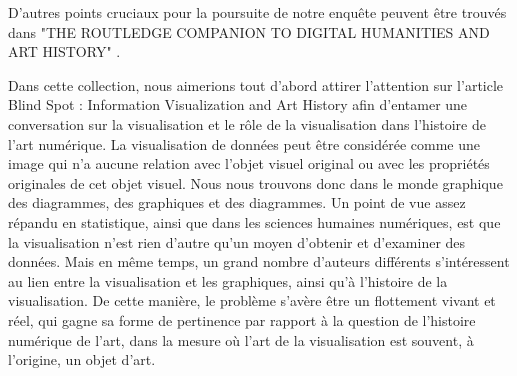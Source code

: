 \documentclass[a4paper, twoside, 12pt]{book}
\begin{document}
D'autres points cruciaux pour la poursuite de notre enquête peuvent être trouvés dans "THE ROUTLEDGE COMPANION TO DIGITAL HUMANITIES AND ART HISTORY" .

Dans cette collection, nous aimerions tout d'abord attirer l'attention sur l'article Blind Spot : Information Visualization and Art History afin d'entamer une conversation sur la visualisation et le rôle de la visualisation dans l'histoire de l'art numérique. La visualisation de données peut être considérée comme une image qui n'a aucune relation avec l'objet visuel original ou avec les propriétés originales de cet objet visuel. Nous nous trouvons donc dans le monde graphique des diagrammes, des graphiques et des diagrammes. Un point de vue assez répandu en statistique, ainsi que dans les sciences humaines numériques, est que la visualisation n'est rien d'autre qu'un moyen d'obtenir et d'examiner des données. Mais en même temps, un grand nombre d'auteurs différents s'intéressent au lien entre la visualisation et les graphiques, ainsi qu'à l'histoire de la visualisation. De cette manière, le problème s'avère être un flottement vivant et réel, qui gagne sa forme de pertinence par rapport à la question de l'histoire numérique de l'art, dans la mesure où l'art de la visualisation est souvent, à l'origine, un objet d'art. 
\end{document}
